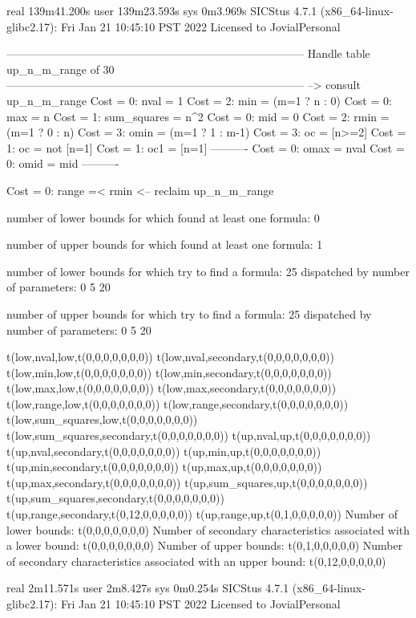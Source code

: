 real	139m41.200s
user	139m23.593s
sys	0m3.969s
SICStus 4.7.1 (x86_64-linux-glibc2.17): Fri Jan 21 10:45:10 PST 2022
Licensed to JovialPersonal


--------------------------------------------------------------------------------
Handle table up_n_m_range of 30
--------------------------------------------------------------------------------
--> consult up_n_m_range
Cost =  0:  nval        = 1
Cost =  2:  min         = (m=1 ? n : 0)
Cost =  0:  max         = n
Cost =  1:  sum_squares = n^2
Cost =  0:  mid         = 0
Cost =  2:  rmin        = (m=1 ? 0 : n)
Cost =  3:  omin        = (m=1 ? 1 : m-1)
Cost =  3:  oc          = [n>=2]
Cost =  1:  oc          = not [n=1]
Cost =  1:  oc1         = [n=1]
----------
Cost =  0:  omax        = nval
Cost =  0:  omid        = mid
----------

Cost =  0:  range =< rmin
<-- reclaim up_n_m_range

number of lower bounds for which found at least one formula: 0

number of upper bounds for which found at least one formula: 1

number of lower bounds for which try to find a formula: 25
dispatched by number of parameters: 0  5  20

number of upper bounds for which try to find a formula: 25
dispatched by number of parameters: 0  5  20

t(low,nval,low,t(0,0,0,0,0,0,0))
t(low,nval,secondary,t(0,0,0,0,0,0,0))
t(low,min,low,t(0,0,0,0,0,0,0))
t(low,min,secondary,t(0,0,0,0,0,0,0))
t(low,max,low,t(0,0,0,0,0,0,0))
t(low,max,secondary,t(0,0,0,0,0,0,0))
t(low,range,low,t(0,0,0,0,0,0,0))
t(low,range,secondary,t(0,0,0,0,0,0,0))
t(low,sum_squares,low,t(0,0,0,0,0,0,0))
t(low,sum_squares,secondary,t(0,0,0,0,0,0,0))
t(up,nval,up,t(0,0,0,0,0,0,0))
t(up,nval,secondary,t(0,0,0,0,0,0,0))
t(up,min,up,t(0,0,0,0,0,0,0))
t(up,min,secondary,t(0,0,0,0,0,0,0))
t(up,max,up,t(0,0,0,0,0,0,0))
t(up,max,secondary,t(0,0,0,0,0,0,0))
t(up,sum_squares,up,t(0,0,0,0,0,0,0))
t(up,sum_squares,secondary,t(0,0,0,0,0,0,0))
t(up,range,secondary,t(0,12,0,0,0,0,0))
t(up,range,up,t(0,1,0,0,0,0,0))
Number of lower bounds:                                             t(0,0,0,0,0,0,0)
Number of secondary characteristics associated with a lower bound:  t(0,0,0,0,0,0,0)
Number of upper bounds:                                             t(0,1,0,0,0,0,0)
Number of secondary characteristics associated with an upper bound: t(0,12,0,0,0,0,0)

real	2m11.571s
user	2m8.427s
sys	0m0.254s
SICStus 4.7.1 (x86_64-linux-glibc2.17): Fri Jan 21 10:45:10 PST 2022
Licensed to JovialPersonal


